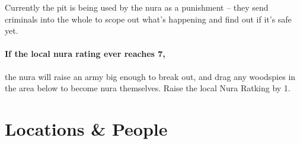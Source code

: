 \begin{multicols}{2}

Currently the pit is being used by the nura as a punishment -- they send criminals into the whole to scope out what's happening and find out if it's safe yet.

\paragraph{If the local nura rating ever reaches 7,}
the nura will raise an army big enough to break out, and drag any woodspies in the area below to become nura themselves.
Raise the local Nura Ratking by 1.


\stopcontents[sq]

\end{multicols}

\stopcontents[Forest]

\section{Locations \& People}

